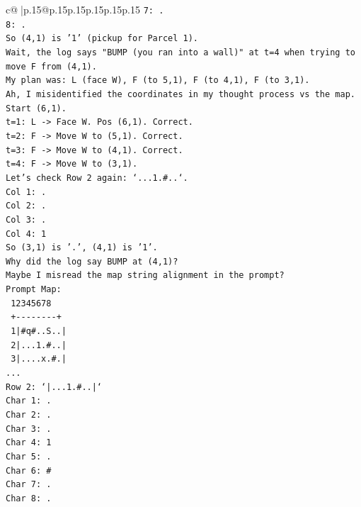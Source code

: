 \documentclass{article}
\begin{document}
{\begin{supertabular}{c@{$\;$}|p{.15\linewidth}@{}p{.15\linewidth}p{.15\linewidth}p{.15\linewidth}p{.15\linewidth}p{.15\linewidth}}
{{{\texttt{7: .} \\
\texttt{8: .} \\
\texttt{So (4,1) is '1' (pickup for Parcel 1).} \\
\texttt{Wait, the log says "BUMP (you ran into a wall)" at t=4 when trying to move F from (4,1).} \\
\texttt{My plan was: L (face W), F (to 5,1), F (to 4,1), F (to 3,1).} \\
\texttt{Ah, I misidentified the coordinates in my thought process vs the map.} \\
\texttt{Start (6,1).} \\
\texttt{t=1: L {-}> Face W. Pos (6,1). Correct.} \\
\texttt{t=2: F {-}> Move W to (5,1). Correct.} \\
\texttt{t=3: F {-}> Move W to (4,1). Correct.} \\
\texttt{t=4: F {-}> Move W to (3,1).} \\
\texttt{Let's check Row 2 again: `...1.\#..`.} \\
\texttt{Col 1: .} \\
\texttt{Col 2: .} \\
\texttt{Col 3: .} \\
\texttt{Col 4: 1} \\
\texttt{So (3,1) is '.', (4,1) is '1'.} \\
\texttt{Why did the log say BUMP at (4,1)?} \\
\texttt{Maybe I misread the map string alignment in the prompt?} \\
\texttt{Prompt Map:} \\
\texttt{  12345678} \\
\texttt{  +{-}{-}{-}{-}{-}{-}{-}{-}+} \\
\texttt{ 1|\#q\#..S..|} \\
\texttt{ 2|...1.\#..|} \\
\texttt{ 3|....x.\#.|} \\
\texttt{...} \\
\texttt{Row 2: `|...1.\#..|`} \\
\texttt{Char 1: .} \\
\texttt{Char 2: .} \\
\texttt{Char 3: .} \\
\texttt{Char 4: 1} \\
\texttt{Char 5: .} \\
\texttt{Char 6: \#} \\
\texttt{Char 7: .} \\
\texttt{Char 8: .} \\
}}}
\end{supertabular}}
\end{document}
